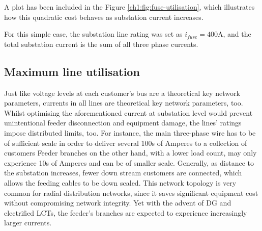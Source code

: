 

A plot has been included in the Figure \ref{ch1:fig:fuse-utilisation}, which illustrates how this quadratic cost behaves as substation current increases.



For this simple case, the substation line rating was set as $i_{fuse}=400\text{A}$, and the total substation current is the sum of all three phase currents.

\subsection{Maximum line utilisation}
\label{ch1:subsec:maximum-line-utilisation}

Just like voltage levels at each customer's bus are a theoretical key network parameters, currents in all lines are theoretical key network parameters, too.
Whilst optimising the aforementioned current at substation level would prevent unintentional feeder disconnection and equipment damage, the lines' ratings impose distributed limits, too.
For instance, the main three-phase wire has to be of sufficient scale in order to deliver several 100s of Amperes to a collection of customers
Feeder branches on the other hand, with a lower load count, may only experience 10s of Amperes and can be of smaller scale.
Generally, as distance to the substation increases, fewer down stream customers are connected, which allows the feeding cables to be down scaled.
This network topology is very common for radial distribution networks, since it saves significant equipment cost without compromising network integrity.
Yet with the advent of DG and electrified LCTs, the feeder's branches are expected to experience increasingly larger currents.



